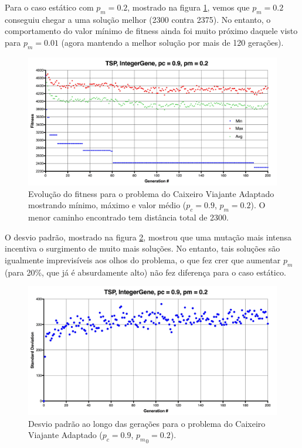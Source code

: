 Para o caso estático com $p_m = 0.2$, mostrado na figura \ref{fig:tsp02}, vemos que $p_m = 0.2$ conseguiu chegar a uma solução melhor (2300 contra 2375). No entanto, o comportamento do valor mínimo de fitness ainda foi muito próximo daquele visto para $p_m = 0.01$ (agora mantendo a melhor solução por mais de 120 gerações).

\begin{figure}[ht!]
    \centering \includegraphics[width=1.0\textwidth]{tsp_02.jpg}
    \caption{Evolução do fitness para o problema do Caixeiro Viajante Adaptado mostrando mínimo, máximo e valor médio ($p_c=0.9$, $p_m=0.2$). O menor caminho encontrado tem distância total de 2300.}
    \label{fig:tsp02}
\end{figure}

O desvio padrão, mostrado na figura \ref{fig:tsp02std}, mostrou que uma mutação mais intensa incentiva o surgimento de muito mais soluções. No entanto, tais soluções são igualmente imprevisíveis aos olhos do problema, o que fez crer que aumentar $p_m$ (para 20\%, que já é absurdamente alto) não fez diferença para o caso estático.

\begin{figure}[ht!]
    \centering \includegraphics[width=1.0\textwidth]{tsp_02_std.jpg}
    \caption{Desvio padrão ao longo das gerações para o problema do Caixeiro Viajante Adaptado ($p_c=0.9$, ${p_m}_0=0.2$).}
    \label{fig:tsp02std}
\end{figure}

